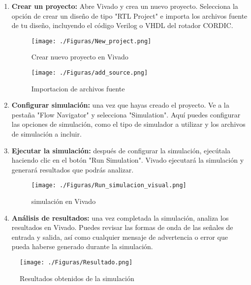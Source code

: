 \documentclass[12pt,a4paper, twoside]{article} %
\begin{document}
\begin{enumerate}
    \item \textbf{Crear un proyecto:} Abre Vivado y crea un nuevo proyecto. Selecciona la opción de crear un diseño de tipo "RTL Project" e importa los archivos fuente de tu diseño, incluyendo el código Verilog o VHDL del rotador CORDIC.

    \begin{figure}[ht]
    \centering
    \texttt{[image: ./Figuras/New\_project.png]}
    \caption{Crear nuevo proyecto en Vivado}
    \label{fig:new_proyect}
    \end{figure}
    
        
    \begin{figure}[ht]
    \centering
    \texttt{[image: ./Figuras/add\_source.png]}
    \caption{Importacion de archivos fuente}
    \label{fig:add_source}
    \end{figure} 
       
   
    
    \item \textbf{Configurar simulación:} una vez que hayas creado el proyecto. Ve a la pestaña "Flow Navigator" y selecciona "Simulation". Aquí puedes configurar las opciones de simulación, como el tipo de simulador a utilizar y los archivos de simulación a incluir.

    
    \item \textbf{Ejecutar la simulación:} después de configurar la simulación, ejecútala haciendo clic en el botón "Run Simulation". Vivado ejecutará la simulación y generará resultados que podrás analizar.
    \begin{figure}[ht]
    \centering
    \texttt{[image: ./Figuras/Run\_simulacion\_visual.png]}
    \caption{simulación en Vivado}
    \label{fig:simulación}
    \end{figure}
    
   
        \item \textbf{Análisis de resultados:} una vez completada la simulación, analiza los resultados en Vivado. Puedes revisar las formas de onda de las señales de entrada y salida, así como cualquier mensaje de advertencia o error que pueda haberse generado durante la simulación.
\end{enumerate}


    \begin{figure}[ht]
    \centering
    \texttt{[image: ./Figuras/Resultado.png]}
    \caption{Resultados obtenidos de la simulación}
    \label{fig:esquema}
    \end{figure}
\end{document}
